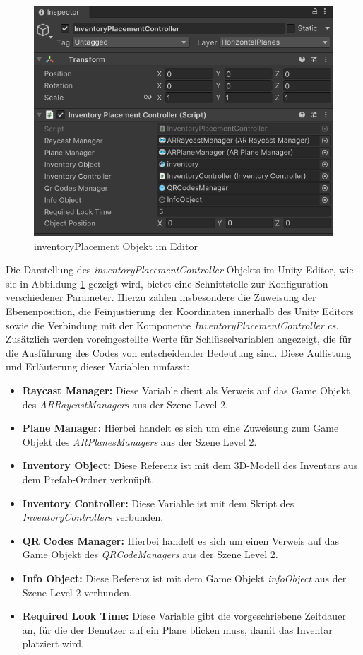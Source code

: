 \begin{figure}[h]
    \centering
    \includegraphics[scale=0.8]{images/invPlace_Editor}
    \caption{inventoryPlacement Objekt im Editor}
    \label{fig:inventoryPlacementController_Editor}
\end{figure}

Die Darstellung des \textit{inventoryPlacementController}-Objekts im Unity Editor, wie sie in
Abbildung \ref{fig:inventoryPlacementController_Editor} gezeigt wird, bietet eine Schnittstelle zur Konfiguration
verschiedener Parameter. Hierzu zählen insbesondere die Zuweisung der Ebenenposition, die Feinjustierung der Koordinaten
innerhalb des Unity Editors sowie die Verbindung mit der Komponente \textit{InventoryPlacementController.cs}. Zusätzlich
werden voreingestellte Werte für Schlüsselvariablen angezeigt, die für die Ausführung des Codes von entscheidender Bedeutung
sind. Diese Auflistung und Erläuterung dieser Variablen umfasst:

\begin{itemize}
    \item \textbf{Raycast Manager:} Diese Variable dient als Verweis auf das Game Objekt des \textit{ARRaycastManagers}
    aus der Szene Level 2.
    \item \textbf{Plane Manager:} Hierbei handelt es sich um eine Zuweisung zum Game Objekt des \textit{ARPlanesManagers}
    aus der Szene Level 2.
    \item \textbf{Inventory Object:} Diese Referenz ist mit dem 3D-Modell des Inventars aus dem Prefab-Ordner verknüpft.
    \item \textbf{Inventory Controller:} Diese Variable ist mit dem Skript des \textit{InventoryControllers} verbunden.
    \item \textbf{QR Codes Manager:} Hierbei handelt es sich um einen Verweis auf das Game Objekt des \textit{QRCodeManagers}
    aus der Szene Level 2.
    \item \textbf{Info Object:} Diese Referenz ist mit dem Game Objekt \textit{infoObject} aus der Szene Level 2 verbunden.
    \item \textbf{Required Look Time:} Diese Variable gibt die vorgeschriebene Zeitdauer an, für die der Benutzer auf ein
    Plane blicken muss, damit das Inventar platziert wird.
\end{itemize}

